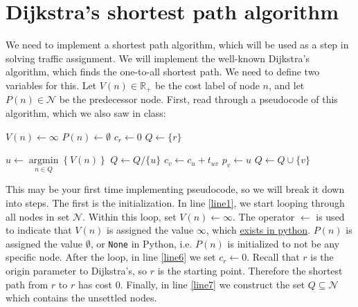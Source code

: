 \documentclass[11pt]{article}
\newcommand{\N}{\mathcal{N}}
\newcommand{\A}{\mathcal{A}}
\DeclareMathOperator*{\argmin}{\arg\min}
\begin{document}
\section{Dijkstra's shortest path algorithm}


We need to implement a shortest path algorithm, which will be used as a step in solving traffic assignment. We will implement the well-known Dijkstra's algorithm, which finds the one-to-all shortest path. We need to define two variables for this. Let $V(n)\in\mathbb{R}_+$ be the cost label of node $n$, and let $P(n)\in\N$ be the predecessor node. First, read through a pseudocode of this algorithm, which we also saw in class:


\vspace{\baselineskip}


\begin{algorithmic}[1]
	\For{$n\in \N$}  \label{line1}
	\State $V(n) \leftarrow \infty$
	\State $P(n) \leftarrow \emptyset$
	\EndFor
	\State $c_r \leftarrow 0$ \label{line6}
	\State  $Q\leftarrow \{r\}$ \label{line7}
	
	\vspace{0.5\baselineskip}
	
	  \label{line8}
	\State $u\leftarrow \argmin\limits_{n\in Q} \left\{ V(n)\right\}$ \label{line9}
	\State $Q\leftarrow Q/\{u\}$
	\For{$(u,v)\in\A$} \label{line10}
	  \label{line11}
	\State $c_v \leftarrow c_u + t_{uv}$  \label{line12}
	\State $p_v \leftarrow u$
	\State $Q\leftarrow Q\cup \{v\}$ \label{line14}
	\EndIf
	\EndFor
	\EndWhile \label{line17}
	\EndProcedure 
	
\end{algorithmic}

\vspace{\baselineskip}

\noindent This may be your first time implementing pseudocode, so we will break it down into steps. The first is the initialization. In line \ref{line1}, we start looping through all nodes in set $\N$. Within this loop, set $V(n) \leftarrow \infty$. The operator $\leftarrow$ is used to indicate that $V(n)$ is assigned the value $\infty$, which \href{https://www.w3schools.com/python/ref_math_inf.asp}{exists in python}. $P(n)$ is assigned the value $\emptyset$, or \texttt{None} in Python, i.e. $P(n)$ is initialized to not be any specific node. After the loop, in line \ref{line6} we set $c_r\leftarrow 0$. Recall that $r$ is the origin parameter to Dijkstra's, so $r$ is the starting point. Therefore the shortest path from $r$ to $r$ has cost $0$. Finally, in line \ref{line7} we construct the set $Q\subseteq\N$ which contains the unsettled nodes. 
\end{document}
